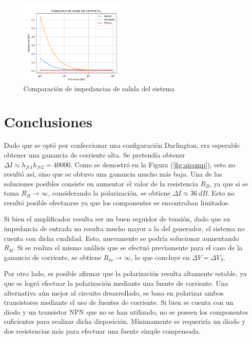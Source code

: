 \begin{figure}[H]
\centering
	\includegraphics[width=0.5\textwidth]{Imagenes/Ros.png}
	\caption{Comparación de impedancias de salida del sistema}
\end{figure}

\section{Conclusiones}
Dado que se optó por confeccionar una configuración Darlington, era esperable obtener una ganancia de corriente alta. Se pretendía obtener $\Delta I \approx h_{fe1} h_{fe2} = 40000$. Como se demostró en la Figura (\ref{fig:aicomp}), esto no resultó así, sino que se obtuvo una ganancia mucho más baja. Una de las soluciones posibles consiste en aumentar el valor de la resistencia $R_B$, ya que si se toma $R_B \rightarrow \infty$, considerando la polarización, se obtiene $\Delta I \approx 36 \ dB$. Esto no resultó posible efectuarse ya que los componentes se encontraban limitados.

Si bien el amplificador resulta ser un buen seguidor de tensión, dado que su impedancia de entrada no resulta mucho mayor a la del generador, el sistema no cuenta con dicha cualidad. Esto, nuevamente se podría solucionar aumentando $R_B$. Si se realiza el mismo análisis que se efectuó previamente para el caso de la ganancia de corriente, se obtiene $R_{ia} \rightarrow \infty$, lo que concluye en $\Delta V = \Delta V_S$.

Por otro lado, es posible afirmar que la polarización resulta altamente estable, ya que se logró efectuar la polarización mediante una fuente de corriente. Una alternativa aún mejor al circuito desarrollado, se basa en polarizar ambos transistores mediante el uso de fuentes de corriente. Si bien se cuenta con un diodo y un transistor NPN que no se han utilizado, no se poseen los componentes suficientes para realizar dicha disposición. Mínimamente se requeriría un diodo y dos resistencias más para efectuar una fuente simple compensada.
	
